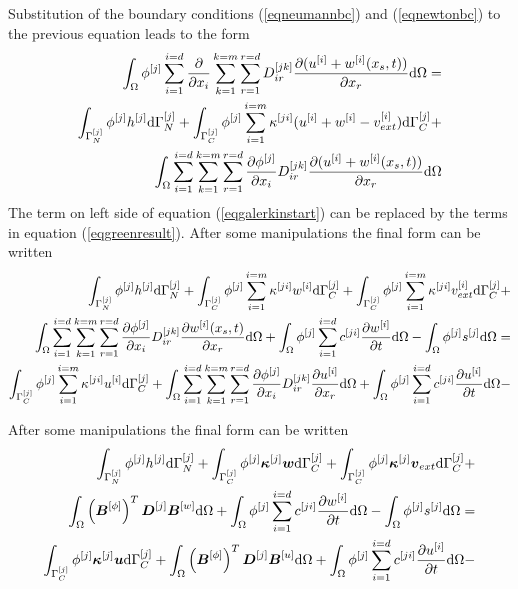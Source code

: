 Substitution of the boundary conditions (\ref{eqneumannbc}) and (\ref{eqnewtonbc}) to the previous equation leads
to the form
\begin{eqnarray}\label{eqgreenresult}
\int_{\Omega} \phi^{[j]} \sum_{i=1}^{i=d} \mbox{$\displaystyle\frac{\partial{}}{\partial{x_i}}$} \sum_{k=1}^{k=m} \sum_{r=1}^{r=d} D^{[jk]}_{ir} 
\mbox{$\displaystyle\frac{\partial{(u^{[i]}+w^{[i]}(x_s,t))}}{\partial{x_r}}$} {\rm d}\Omega =
\\ \nonumber
\int_{\Gamma^{[j]}_N} \phi^{[j]} h^{[j]} {\rm d}\Gamma^{[j]}_N +
\int_{\Gamma^{[j]}_C} \phi^{[j]} \sum_{i=1}^{i=m} \kappa^{[ji]} (u^{[i]}+w^{[i]}-v^{[i]}_{ext}) {\rm d}\Gamma^{[j]}_C +
\\ \nonumber
\int_{\Omega} \sum_{i=1}^{i=d} \sum_{k=1}^{k=m} \sum_{r=1}^{r=d} \mbox{$\displaystyle\frac{\partial{\phi^{[j]}}}{\partial{x_i}}$} D^{[jk]}_{ir} 
\mbox{$\displaystyle\frac{\partial{(u^{[i]}+w^{[i]}(x_s,t))}}{\partial{x_r}}$} {\rm d}\Omega
\end{eqnarray}
The term on left side of equation (\ref{eqgalerkinstart}) can be replaced by the terms in equation (\ref{eqgreenresult}).
After some manipulations the final form can be written
\begin{eqnarray}
\int_{\Gamma^{[j]}_N} \phi^{[j]} h^{[j]} {\rm d}\Gamma^{[j]}_N +
\int_{\Gamma^{[j]}_C} \phi^{[j]} \sum_{i=1}^{i=m} \kappa^{[ji]} w^{[i]} {\rm d}\Gamma^{[j]}_C +
\int_{\Gamma^{[j]}_C} \phi^{[j]} \sum_{i=1}^{i=m} \kappa^{[ji]} v^{[i]}_{ext} {\rm d}\Gamma^{[j]}_C +
\\ \nonumber
\int_{\Omega} \sum_{i=1}^{i=d} \sum_{k=1}^{k=m} \sum_{r=1}^{r=d} \mbox{$\displaystyle\frac{\partial{\phi^{[j]}}}{\partial{x_i}}$} D^{[jk]}_{ir} 
\mbox{$\displaystyle\frac{\partial{w^{[i]}(x_s,t)}}{\partial{x_r}}$} {\rm d}\Omega +
\int_{\Omega} \phi^{[j]} \sum_{i=1}^{i=d} c^{[ji]} \mbox{$\displaystyle\frac{\partial{w^{[i]}}}{\partial{t}}$} {\rm d}\Omega - 
\int_{\Omega} \phi^{[j]} s^{[j]} {\rm d}\Omega = 
\\ \nonumber
\int_{\Gamma^{[j]}_C} \phi^{[j]} \sum_{i=1}^{i=m} \kappa^{[ji]} u^{[i]} {\rm d}\Gamma^{[j]}_C +
\int_{\Omega} \sum_{i=1}^{i=d} \sum_{k=1}^{k=m} \sum_{r=1}^{r=d} \mbox{$\displaystyle\frac{\partial{\phi^{[j]}}}{\partial{x_i}}$} D^{[jk]}_{ir} 
\mbox{$\displaystyle\frac{\partial{u^{[i]}}}{\partial{x_r}}$} {\rm d}\Omega +
\int_{\Omega} \phi^{[j]} \sum_{i=1}^{i=d} c^{[ji]} \mbox{$\displaystyle\frac{\partial{u^{[i]}}}{\partial{t}}$} {\rm d}\Omega - 
\end{eqnarray}

After some manipulations the final form can be written
\begin{eqnarray}
\int_{\Gamma^{[j]}_N} \phi^{[j]} h^{[j]} {\rm d}\Gamma^{[j]}_N +
\int_{\Gamma^{[j]}_C} \phi^{[j]} \mbox{\boldmath$\kappa$}^{[j]} \mbox{\boldmath$w$} {\rm d}\Gamma^{[j]}_C +
\int_{\Gamma^{[j]}_C} \phi^{[j]} \mbox{\boldmath$\kappa$}^{[j]} \mbox{\boldmath$v$}_{ext} {\rm d}\Gamma^{[j]}_C +
\\ \nonumber
\int_{\Omega} \left(\mbox{\boldmath$B$}^{[\phi]}\right)^T \mbox{\boldmath$D$}^{[j]} \mbox{\boldmath$B$}^{[w]} {\rm d}\Omega +
\int_{\Omega} \phi^{[j]} \sum_{i=1}^{i=d} c^{[ji]} \mbox{$\displaystyle\frac{\partial{w^{[i]}}}{\partial{t}}$} {\rm d}\Omega - 
\int_{\Omega} \phi^{[j]} s^{[j]} {\rm d}\Omega = 
\\ \nonumber
\int_{\Gamma^{[j]}_C} \phi^{[j]} \mbox{\boldmath$\kappa$}^{[j]} \mbox{\boldmath$u$} {\rm d}\Gamma^{[j]}_C +
\int_{\Omega} \left(\mbox{\boldmath$B$}^{[\phi]}\right)^T  \mbox{\boldmath$D$}^{[j]} \mbox{\boldmath$B$}^{[u]} {\rm d}\Omega +
\int_{\Omega} \phi^{[j]} \sum_{i=1}^{i=d} c^{[ji]} \mbox{$\displaystyle\frac{\partial{u^{[i]}}}{\partial{t}}$} {\rm d}\Omega - 
\end{eqnarray}




